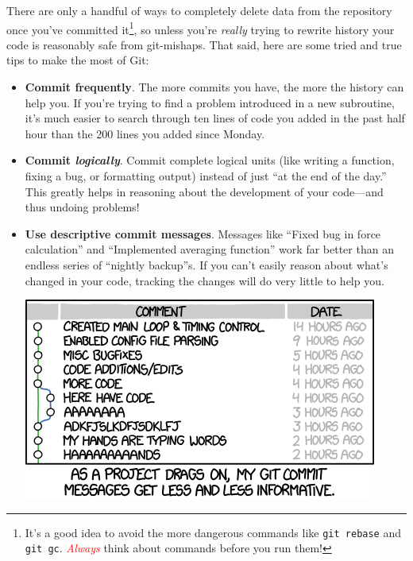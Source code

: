 There are only a handful of ways to completely delete data from the repository once you've committed it\footnote{It's a good idea to avoid the more dangerous commands like \texttt{git rebase} and \texttt{git gc}. \textcolor{red}{\emph{Always}} think about commands before you run them!}, so unless you're \emph{really} trying to rewrite history your code is reasonably safe from git-mishaps.
That said, here are some tried and true tips to make the most of Git:
\begin{itemize}
  \item \textbf{Commit frequently}. The more commits you have, the more the history can help you.
    If you're trying to find a problem introduced in a new subroutine, it's much easier to search through ten lines of code you added in the past half hour than the 200 lines you added since Monday.
  \item \textbf{Commit \emph{logically}}. Commit complete logical units (like writing a function, fixing a bug, or formatting output) instead of just ``at the end of the day.''
    This greatly helps in reasoning about the development of your code---and thus undoing problems!
  \item \textbf{Use descriptive commit messages}. Messages like ``Fixed bug in force calculation'' and ``Implemented averaging function'' work far better than an endless series of ``nightly backup''s.
    If you can't easily reason about what's changed in your code, tracking the changes will do very little to help you.
\begin{marginfigure}[-1.1cm]
  \centering
  \label{fig:git_commit}
  \includegraphics[width=\textwidth]{figures/git_commit.png}


\end{marginfigure}
\end{itemize}
